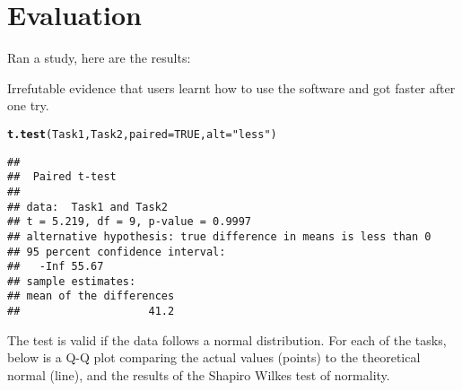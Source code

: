\documentclass[12pt, twoside, a4paper, openright]{report}\usepackage[]{graphicx}\usepackage[]{color}
\makeatletter
\newcommand{\hlnum}[1]{\textcolor[rgb]{0.686,0.059,0.569}{#1}}%
\newcommand{\hlstr}[1]{\textcolor[rgb]{0.192,0.494,0.8}{#1}}%
\newcommand{\hlstd}[1]{\textcolor[rgb]{0.345,0.345,0.345}{#1}}%
\newcommand{\hlkwc}[1]{\textcolor[rgb]{0.333,0.667,0.333}{#1}}%
\newcommand{\hlkwd}[1]{\textcolor[rgb]{0.737,0.353,0.396}{\textbf{#1}}}%
\newenvironment{kframe}{%
 \def\at@end@of@kframe{}%
 \ifinner\ifhmode%
  \def\at@end@of@kframe{\end{minipage}}%
  \begin{minipage}{\columnwidth}%
 \fi\fi%
 \def\FrameCommand##1{\hskip\@totalleftmargin \hskip-\fboxsep
 \colorbox{shadecolor}{##1}\hskip-\fboxsep
     \hskip-\linewidth \hskip-\@totalleftmargin \hskip\columnwidth}%
 \MakeFramed {\advance\hsize-\width
   \@totalleftmargin\z@ \linewidth\hsize
   \@setminipage}}%
 {\par\unskip\endMakeFramed%
 \at@end@of@kframe}
\newenvironment{knitrout}{}{} %
\makeatother
\begin{document}
\lstset{language=[Sharp]C}

\pagestyle{empty}



\cleardoublepage

\pagestyle{plain}



\tableofcontents


\clearpage


\setcounter{page}{1}
\pagestyle{headings}





\section{Evaluation}

Ran a study, here are the results:




Irrefutable evidence that users learnt how to use the software and got faster after one try.
\begin{knitrout}
\color{fgcolor}\begin{kframe}
\begin{alltt}
\hlkwd{t.test}\hlstd{(Task1, Task2,} \hlkwc{paired} \hlstd{=} \hlnum{TRUE}\hlstd{,} \hlkwc{alt} \hlstd{=} \hlstr{"less"}\hlstd{)}
\end{alltt}
\begin{verbatim}
## 
## 	Paired t-test
## 
## data:  Task1 and Task2
## t = 5.219, df = 9, p-value = 0.9997
## alternative hypothesis: true difference in means is less than 0
## 95 percent confidence interval:
##   -Inf 55.67
## sample estimates:
## mean of the differences 
##                    41.2
\end{verbatim}
\end{kframe}
\end{knitrout}


The test is valid if the data follows a normal distribution. For each of the tasks, below is a Q-Q plot comparing the actual values (points) to the theoretical normal (line), and the results of the Shapiro Wilkes test of normality.
\end{document}
